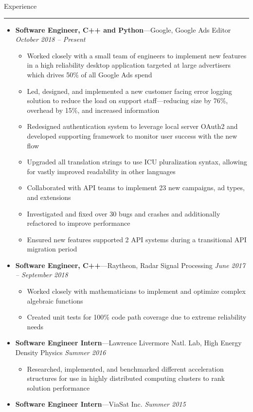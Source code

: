 \documentclass[10pt,oneside]{article}
\newcommand{\sectitle}[1]{
  \begin{flushleft}{\selectfont\Large#1}\end{flushleft}
}
\newenvironment{ressection}[1]{
  \vspace{0pt}
  \sectitle{#1}
  \vspace{-10pt}\rule{\textwidth}{0.5pt}
  \vspace{-10pt}
  \begin{itemize}[leftmargin=13pt]
  \vspace{-2pt}
}{
  \end{itemize}
}
\newcommand{\ressubitem}[1]{
  \vspace{-1pt}
  \item[--] \begin{flushleft} #1 \end{flushleft}
}
\newcommand{\resbigitemline}[3]{
  \vspace{-1pt}
  \item
  \textbf{#1}---#2
  \hfill
  \textit{#3}
}
\newenvironment{ressubsecline}[3]{
  \resbigitemline{#1}{#2}{#3}
  \vspace{-2pt}
  \begin{itemize}
}{
  \end{itemize}
  \vspace{-2pt}
}
\begin{document}
\begin{ressection}{Experience}
  \begin{ressubsecline}{Software Engineer, C++ and Python}{Google, Google Ads Editor}{October 2018 -- Present}
    \ressubitem{Worked closely with a small team of engineers to implement new features in a high reliability desktop application targeted at large advertisers which drives 50\% of all Google Ads spend}
    \ressubitem{Led, designed, and implemented a new customer facing error logging solution to reduce the load on support staff---reducing size by 76\%, overhead by 15\%, and increased information}
    \ressubitem{Redesigned authentication system to leverage local server OAuth2 and developed supporting framework to monitor user success with the new flow}
    \ressubitem{Upgraded all translation strings to use ICU pluralization syntax, allowing for vastly improved readability in other languages}
    \ressubitem{Collaborated with API teams to implement 23 new campaigns, ad types, and extensions}
    \ressubitem{Investigated and fixed over 30 bugs and crashes and additionally refactored to improve performance}
    \ressubitem{Ensured new features supported 2 API systems during a transitional API migration period}
  \end{ressubsecline}
  \begin{ressubsecline}{Software Engineer, C++}{Raytheon, Radar Signal Processing}{June 2017 -- September 2018}
    \ressubitem{Worked closely with mathematicians to implement and optimize complex algebraic functions}
    \ressubitem{Created unit tests for 100\% code path coverage due to extreme reliability needs}
  \end{ressubsecline}
  \begin{ressubsecline}{Software Engineer Intern}{Lawrence Livermore Natl. Lab, High Energy Density Physics}{Summer 2016}
    \ressubitem{Researched, implemented, and benchmarked different acceleration structures for use in highly distributed computing clusters to rank solution performance}
  \end{ressubsecline}
  \resbigitemline{Software Engineer Intern}{ViaSat Inc.}{Summer 2015}
\end{ressection}
\end{document}
